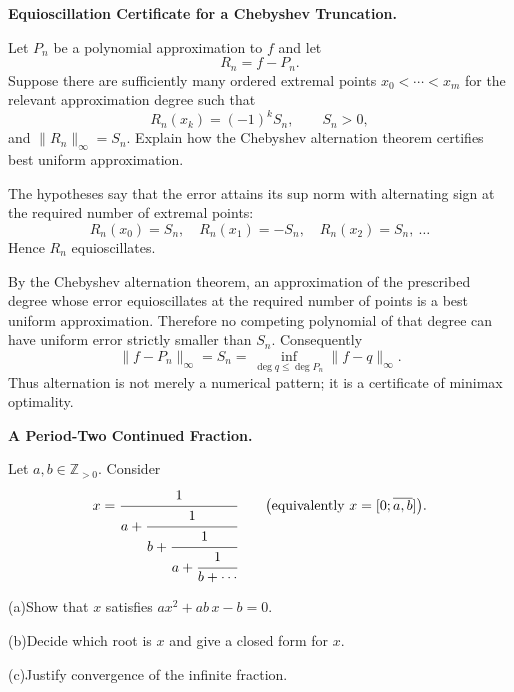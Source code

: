\begin{problem}[CP-II-0363]
\label{prob:cp-ii-0363}
\textbf{Equioscillation Certificate for a Chebyshev Truncation.}

\hspace*{1.5em}Let \(P_n\) be a polynomial approximation to \(f\) and let
\[
R_n=f-P_n.
\]
Suppose there are sufficiently many ordered extremal points
\(x_0<\cdots<x_m\) for the relevant approximation degree such that
\[
R_n(x_k)=(-1)^kS_n,
\qquad S_n>0,
\]
and \(\|R_n\|_\infty=S_n\). Explain how the Chebyshev alternation theorem
certifies best uniform approximation.
\end{problem}

\begin{solution}
The hypotheses say that the error attains its sup norm with alternating
sign at the required number of extremal points:
\[
R_n(x_0)=S_n,\quad R_n(x_1)=-S_n,\quad R_n(x_2)=S_n,\ \ldots
\]
Hence \(R_n\) equioscillates.

By the Chebyshev alternation theorem, an approximation of the prescribed degree
whose error equioscillates at the required number of points is a best uniform
approximation. Therefore no competing polynomial of that degree can have
uniform error strictly smaller than \(S_n\). Consequently
\[
\boxed{
\|f-P_n\|_\infty=S_n
=
\inf_{\deg q\le\deg P_n}\|f-q\|_\infty.
}
\]
Thus alternation is not merely a numerical pattern; it is a certificate of
minimax optimality.
\end{solution}


\begin{problem}[CP-II-0373]
\label{prob:cp-ii-0373}
\textbf{A Period-Two Continued Fraction.}

	Let $a,b\in\mathbb Z_{>0}$. Consider
	\[
	x=\cfrac{1}{\displaystyle a+\cfrac{1}{\displaystyle b+\cfrac{1}{\displaystyle a+\cfrac{1}{\displaystyle b+\cdots}}}}
	\qquad\bigl(\text{equivalently }x=[0;\overline{a,b}]\bigr).
	\]

		\par\noindent (a)\quad Show that $x$ satisfies $a x^{2}+ab\,x-b=0$.
		\par\noindent (b)\quad Decide which root is $x$ and give a closed form for $x$.
		\par\noindent (c)\quad Justify convergence of the infinite fraction.
\end{problem}


